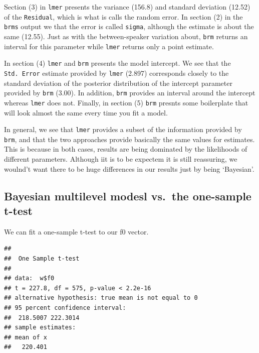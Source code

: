 \documentclass[
]{book}
\newenvironment{Shaded}{\begin{snugshade}}{\end{snugshade}}
\newcommand{\FunctionTok}[1]{\textcolor[rgb]{0.00,0.00,0.00}{#1}}
\newcommand{\NormalTok}[1]{#1}
\newcommand{\SpecialCharTok}[1]{\textcolor[rgb]{0.00,0.00,0.00}{#1}}
\begin{document}
Section (3) in \texttt{lmer} presents the variance (156.8) and standard deviation (12.52) of the \texttt{Residual}, which is what is calls the random error. In section (2) in the \texttt{brms} output we that the error is called \texttt{sigma}, although the estimate is about the same (12.55). Just as with the between-speaker variation about, \texttt{brm} returns an interval for this parameter while \texttt{lmer} returns only a point estimate.

In section (4) \texttt{lmer} and \texttt{brm} presents the model intercept. We see that the \texttt{Std.\ Error} estimate provided by \texttt{lmer} (2.897) corresponds closely to the standard deviation of the posterior distribution of the intercept parameter provided by \texttt{brm} (3.00). In addition, \texttt{brm} provides an interval around the intercept whereas \texttt{lmer} does not. Finally, in section (5) \texttt{brm} presnts some boilerplate that will look almost the same every time you fit a model.

In general, we see that \texttt{lmer} provides a subset of the information provided by \texttt{brm}, and that the two approaches provide basically the same values for estimates. This is because in both cases, results are being dominated by the likelihoods of different parameters. Although iit is to be expectem it is still reassuring, we woulnd't want there to be huge differences in our results just by being `Bayesian'.

\hypertarget{bayesian-multilevel-modesl-vs.-the-one-sample-t-test}{%
\subsection{Bayesian multilevel modesl vs.~the one-sample t-test}\label{bayesian-multilevel-modesl-vs.-the-one-sample-t-test}}

We can fit a one-sample t-test to our f0 vector.

\begin{Shaded}
\end{Shaded}

\begin{verbatim}
## 
##  One Sample t-test
## 
## data:  w$f0
## t = 227.8, df = 575, p-value < 2.2e-16
## alternative hypothesis: true mean is not equal to 0
## 95 percent confidence interval:
##  218.5007 222.3014
## sample estimates:
## mean of x 
##   220.401
\end{verbatim}
\end{document}

